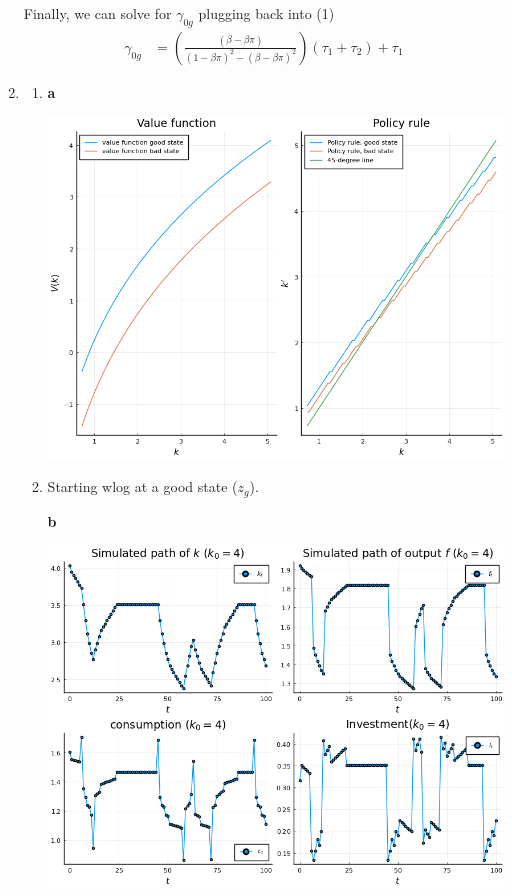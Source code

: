 \documentclass[12pt]{article}
\begin{document}
\begin{enumerate}
Finally, we can solve for $\gamma_{0g}$ plugging back into (1)
\begin{align*}
	\gamma_{0g} &= \left(\frac{(\beta - \beta \pi)}{(1 - \beta \pi)^2 - (\beta - \beta \pi)^2
      } \right) (\tau_1 + \tau_2 ) + \tau_1
\end{align*} 

\item 

	\begin{enumerate}
		\item 
		\begin{center}
			\textbf{a}\par\medskip
			\includegraphics[width=0.8\linewidth]{plot_a.png}
		\end{center}
	\item Starting wlog at a good state ($z_g$).
		\begin{center}
			\textbf{b}\par\medskip
			\includegraphics[width=0.8\linewidth]{plot_b.png}
		\end{center}




\end{enumerate}
\end{enumerate}
\end{document}
